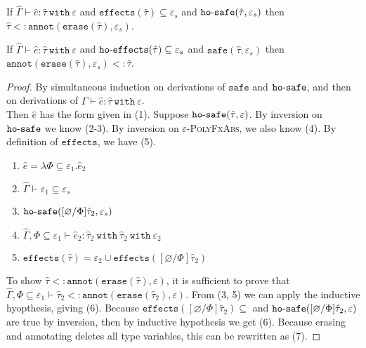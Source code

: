 \documentclass{llncs}
\newcommand{\keywadj}[1]{\mathtt{#1}}
\newcommand{\keyw}[1]{\keywadj{#1}~}
\newcommand{\kw}[1]{\keyw{ #1 }}
\newcommand{\kwa}[1]{\keywadj{ #1 }}
\newcommand{\hyphen}{\hbox{-}}
\newcommand{\fx}[1]{ \kwa{effects}(#1) }
\newcommand{\hofx}[1]{ \kwa{ho \hyphen effects}(#1) }
\newcommand{\safe}[2]{ \kwa{safe}(#1, #2) }
\newcommand{\hosafe}[2]{ \kwa{ho \hyphen safe}(#1, #2) }
\newcommand{\annot}[2]{
	\keywadj{annot}(#1, #2)
}
\newcommand{\erase}[1]{
	\keywadj{erase}(#1)
}
\begin{document}
\hrulefill

\begin{lemma}[Approximation 1]
If $\hat \Gamma \vdash \hat e: \hat \tau~\kw{with} \varepsilon$ and $\fx{\hat \tau} \subseteq \varepsilon_s$ and $\hosafe{\hat \tau}{\varepsilon_s}$ then $\hat \tau <: \annot{\erase{\hat \tau}}{\varepsilon_s}$.
\end{lemma}

\begin{lemma}[Approximation 2]
If $\hat \Gamma \vdash \hat e: \hat \tau~\kw{with} \varepsilon$ and $\hofx{\hat \tau} \subseteq \varepsilon_s$ and $\safe{\hat \tau}{\varepsilon_s}$ then $\annot{\erase{\hat \tau}}{\varepsilon_s} <: \hat \tau$.
\end{lemma}

\begin{proof} By simultaneous induction on derivations of $\kwa{safe}$ and $\kwa{ho \hyphen safe}$, and then on derivations of $\hat \Gamma \vdash \hat e: \hat \tau~\kw{with} \varepsilon$.\\

 Then $\hat e$ has the form given in (1). Suppose $\hosafe{\hat \tau}{\varepsilon}$. By inversion on $\kwa{ho \hyphen safe}$ we know (2-3). By inversion on \textsc{$\varepsilon$-PolyFxAbs}, we also know (4). By definition of $\kwa{effects}$, we have (5).

\begin{enumerate}
	\item $\hat e = \lambda \Phi \subseteq \varepsilon_1. \hat e_2$
	\item $\hat \Gamma \vdash \varepsilon_1 \subseteq \varepsilon_s$
	\item $\hosafe{[\varnothing/\Phi]\hat \tau_2}{\varepsilon_s}$
	\item $\hat \Gamma, \Phi \subseteq \varepsilon_1 \vdash \hat e_2: \hat \tau_2~\kw{with} \hat \tau_2~\kw{with} \varepsilon_2$
	\item $\fx{\hat \tau} = \varepsilon_2 \cup \fx{[\varnothing/\Phi]\hat \tau_2}$
\end{enumerate}

To show $\hat \tau <: \annot{\erase{\hat \tau}}{\varepsilon}$, it is sufficient to prove that $\hat \Gamma, \Phi \subseteq \varepsilon_1 \vdash \hat \tau_2 <: \annot{\erase{\hat \tau_2}}{\varepsilon}$. From (3, 5) we can apply the inductive hyopthesis, giving (6). Because $\fx{[\varnothing/\Phi]\hat \tau_2} \subseteq  $ and $\hosafe{[\varnothing/\Phi]\hat \tau_2}{\varepsilon}$ are true by inversion, then by inductive hypothesis we get (6). Because erasing and annotating deletes all type variables, this can be rewritten as (7).
  

\end{proof}
\end{document}
